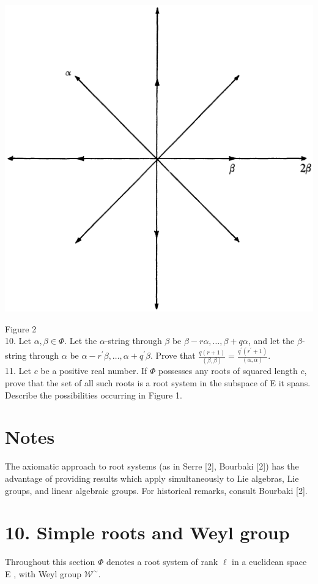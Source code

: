 \documentclass[10pt]{article}
\begin{document}
\begin{enumerate}
\includegraphics[max width=\textwidth, center]{2025_06_06_fac2836a92464059da43g-059}
\end{enumerate}

Figure 2\\
10. Let $\alpha, \beta \in \Phi$. Let the $\alpha$-string through $\beta$ be $\beta-r \alpha, \ldots, \beta+q \alpha$, and let the $\beta$-string through $\alpha$ be $\alpha-r^{\prime} \beta, \ldots, \alpha+q^{\prime} \beta$. Prove that $\frac{q(r+1)}{(\beta, \beta)}=\frac{q^{\prime}\left(r^{\prime}+1\right)}{(\alpha, \alpha)}$.\\
11. Let $c$ be a positive real number. If $\Phi$ possesses any roots of squared length $c$, prove that the set of all such roots is a root system in the subspace of E it spans. Describe the possibilities occurring in Figure 1.

\section*{Notes}
The axiomatic approach to root systems (as in Serre [2], Bourbaki [2]) has the advantage of providing results which apply simultaneously to Lie algebras, Lie groups, and linear algebraic groups. For historical remarks, consult Bourbaki [2].

\section*{10. Simple roots and Weyl group}
Throughout this section $\Phi$ denotes a root system of rank $\ell$ in a euclidean space E , with Weyl group $\mathscr{W}^{\sim}$.
\end{document}
